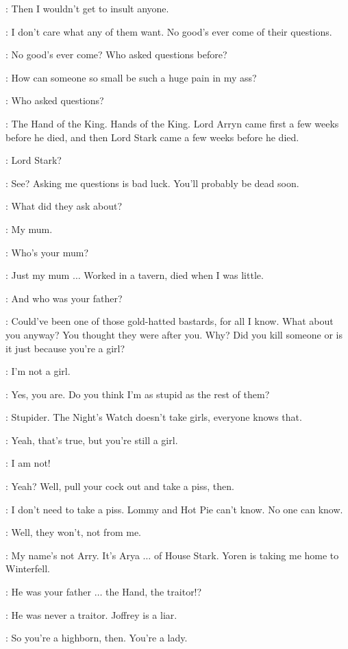 \ARYA: Then I wouldn't get to insult anyone.

\GENDRY: I don't care what any of them want. No good's ever come of their questions.

\ARYA: No good's ever come? Who asked questions before?

\GENDRY: How can someone so small be such a huge pain in my ass?

\ARYA: Who asked questions?

\GENDRY: The Hand of the King. Hands of the King. Lord Arryn came first a few weeks before he died, and then Lord Stark came a few weeks before he died.

\ARYA: Lord Stark?

\GENDRY: See? Asking me questions is bad luck. You'll probably be dead soon.

\ARYA: What did they ask about?

\GENDRY: My mum.

\ARYA: Who's your mum?

\GENDRY: Just my mum $\ldots$ Worked in a tavern, died when I was little.

\ARYA: And who was your father?

\GENDRY: Could've been one of those gold-hatted bastards, for all I know. What about you anyway? You thought they were after you. Why? Did you kill someone or is it just because you're a girl?

\ARYA: I'm not a girl.

\GENDRY: Yes, you are. Do you think I'm as stupid as the rest of them?

\ARYA: Stupider. The Night's Watch doesn't take girls, everyone knows that.

\GENDRY: Yeah, that's true, but you're still a girl.

\ARYA: I am not!

\GENDRY: Yeah? Well, pull your cock out and take a piss, then.

\ARYA: I don't need to take a piss.  Lommy and Hot Pie can't know. No one can know.

\GENDRY: Well, they won't, not from me.

\ARYA: My name's not Arry. It's Arya $\ldots$ of House Stark. Yoren is taking me home to Winterfell.

\GENDRY: He was your father $\ldots$ the Hand, the traitor!?

\ARYA: He was never a traitor. Joffrey is a liar.

\GENDRY: So you're a highborn, then. You're a lady.

